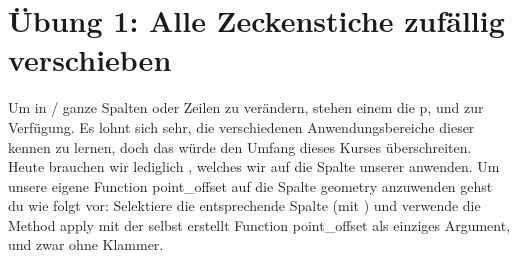 \documentclass[letterpaper,10pt,english]{sphinxmanual}
\begin{document}
\begin{sphinxVerbatim}[commandchars=\\\{\}]
   
   
 
   

  


    
      
      

      

        
        

       

\end{sphinxVerbatim}


\section{Übung 1: Alle Zeckenstiche zufällig verschieben}
\label{\detokenize{02_05_Punkte_einer_GeoDataFrame_verschieben:ubung-1-alle-zeckenstiche-zufallig-verschieben}}
Um in  /  ganze Spalten oder Zeilen zu verändern, stehen einem die  p,  und  zur Verfügung. Es lohnt sich sehr, die verschiedenen Anwendungsbereiche dieser  kennen zu lernen, doch das würde den Umfang dieses Kurses überschreiten. Heute brauchen wir lediglich , welches wir auf die \sphinxhyphen{}Spalte unserer  anwenden.
Um unsere eigene Function point\_offset auf die Spalte geometry anzuwenden gehst du wie folgt vor: Selektiere die entsprechende Spalte (mit \sphinxcode{\sphinxupquote{{[}"spaltenname"{]}}}) und verwende die Method apply mit der selbst erstellt Function point\_offset als einziges Argument, und zwar ohne Klammer.
\end{document}
